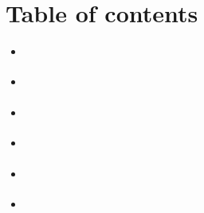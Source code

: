 \documentclass[a4paper,10pt,english]{sphinxmanual}
\begin{document}
\section{Table of contents}
\label{\detokenize{CONTRIBUTING:table-of-contents}}
\sphinxAtStartPar
{\hyperref[\detokenize{CONTRIBUTING:fagus-principles}]{}}

\sphinxAtStartPar
{\hyperref[\detokenize{CONTRIBUTING:how-can-i-contribute}]{}}
\begin{itemize}
\item {}
\sphinxAtStartPar
{\hyperref[\detokenize{CONTRIBUTING:reporting-bugs}]{}}

\item {}
\sphinxAtStartPar
{\hyperref[\detokenize{CONTRIBUTING:requesting-new-features}]{}}

\end{itemize}

\sphinxAtStartPar
{\hyperref[\detokenize{CONTRIBUTING:developing-fagus}]{}}
\begin{itemize}
\item {}
\sphinxAtStartPar
{\hyperref[\detokenize{CONTRIBUTING:software-dependencies-for-development}]{}}

\item {}
\sphinxAtStartPar
{\hyperref[\detokenize{CONTRIBUTING:code-styling-guidelines}]{}}

\item {}
\sphinxAtStartPar
{\hyperref[\detokenize{CONTRIBUTING:setting-up-a-local-fagus-developing-environment}]{}}

\item {}
\sphinxAtStartPar
{\hyperref[\detokenize{CONTRIBUTING:submitting-pull-requests-for-fagus}]{}}

\end{itemize}
\end{document}

